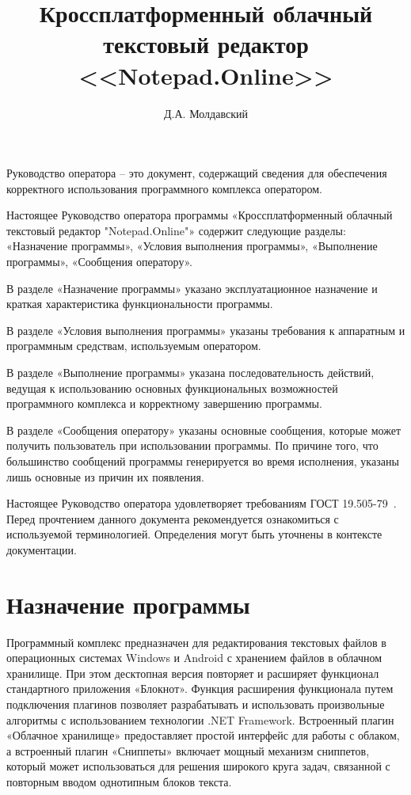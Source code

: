 ﻿\documentclass[opermanual]{espd}
\author{Д.А. Молдавский}
\title{Кроссплатформенный облачный\\текстовый редактор <<Notepad.Online>>}
\begin{document}
\annotation
Руководство оператора -- это документ, содержащий сведения для обеспечения корректного использования программного комплекса оператором.

Настоящее Руководство оператора программы «Кроссплатформенный облачный текстовый редактор "Notepad.Online"» содержит следующие разделы: «Назначение программы», «Условия выполнения программы», «Выполнение программы», «Сообщения оператору».

В разделе «Назначение программы» указано эксплуатационное назначение и краткая характеристика функциональности программы.

В разделе «Условия выполнения программы» указаны требования к аппаратным и программным средствам, используемым оператором.

В разделе «Выполнение программы» указана последовательность действий, ведущая к использованию основных функциональных возможностей программного комплекса и корректному завершению программы.

В разделе «Сообщения оператору» указаны основные сообщения, которые может получить пользователь при использовании программы. По причине того, что большинство сообщений программы генерируется во время исполнения, указаны лишь основные из причин их появления.

Настоящее Руководство оператора удовлетворяет требованиям ГОСТ 19.505-79~\cite{espd505}. Перед прочтением данного документа рекомендуется ознакомиться с используемой терминологией. Определения могут быть уточнены в контексте документации.

\tableofcontents

\section{Назначение программы}

Программный комплекс предназначен для редактирования текстовых файлов в операционных системах Windows и Android с хранением файлов в облачном хранилище. При этом десктопная версия повторяет и расширяет функционал стандартного приложения «Блокнот». Функция расширения функционала путем подключения плагинов позволяет разрабатывать и использовать произвольные алгоритмы с использованием технологии .NET Framework. Встроенный плагин «Облачное хранилище» предоставляет простой интерфейс для работы с облаком, а встроенный плагин «Сниппеты» включает мощный механизм сниппетов, который может использоваться для решения широкого круга задач, связанной с повторным вводом однотипным блоков текста.
\end{document}
